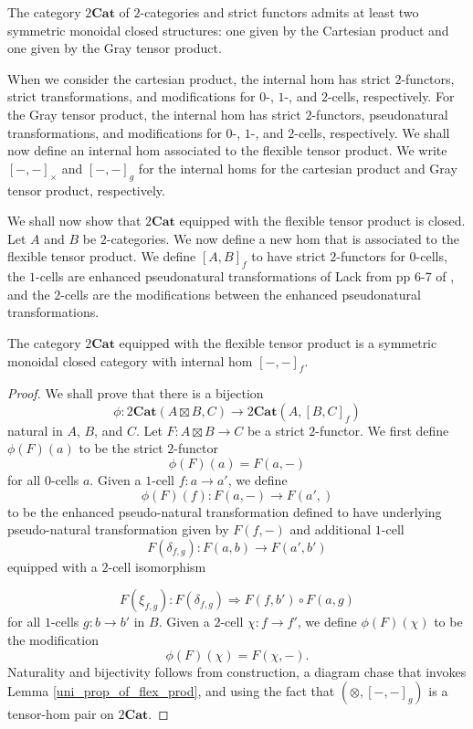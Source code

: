 \documentclass{tac}
\begin{document}
\begin{theorem}\label{new_tensor_product}
The category $2\mathbf{Cat}$ of $2$-categories and strict functors admits at least
two symmetric monoidal closed structures: one given by the Cartesian
product and one given by the Gray tensor product.
\end{theorem}

When we consider the cartesian product, the internal hom has strict $2$-functors, strict transformations, and modifications for $0$-, $1$-, and $2$-cells, respectively. For the Gray tensor product, the internal hom has strict $2$-functors, pseudonatural transformations, and modifications for $0$-, $1$-, and $2$-cells, respectively. We shall now define an internal hom associated to the flexible tensor product. We write $[-,-]_\times$ and $[-,-]_g$ for the internal homs for the cartesian product and Gray tensor product, respectively.

We shall now show that $2\mathbf{Cat}$ equipped with the flexible tensor product is closed. Let $A$ and $B$ be $2$-categories. We now define a new hom that is associated to the flexible tensor product. We define $[A,B]_f$ to have strict $2$-functors for $0$-cells, the $1$-cells are enhanced pseudonatural transformations of Lack from pp 6-7 of \cite{Lack2006}, and the $2$-cells are the modifications between the enhanced pseudonatural transformations.

\begin{theorem}\label{2_cat_with_flex_prod_is_sym_mon_closed}
    The category $2\mathbf{Cat}$ equipped with the flexible tensor product is a symmetric monoidal closed category with internal hom $[-,-]_f$.
\end{theorem}

\begin{proof}
We shall prove that there is a bijection
\[
\phi:2\mathbf{Cat}(A\boxtimes B, C)\to 2\mathbf{Cat}(A,[B,C]_f)
\]
natural in $A$, $B$, and $C$. Let $F:A\boxtimes B\to C$ be a strict $2$-functor. We first define $\phi(F)(a)$ to be the strict $2$-functor
\[
\phi(F)(a)=F(a,-)
\]
for all $0$-cells $a$. Given a $1$-cell $f:a\to a'$, we define 
\[
\phi(F)(f):F(a,-)\to F(a',)
\]
to be the enhanced pseudo-natural transformation defined to have underlying pseudo-natural transformation given by $F(f,-)$ and additional $1$-cell 
\[
F(\delta_{f,g}):F(a,b)\to F(a',b')
\]
equipped with a $2$-cell isomorphism 

\[
F(\xi_{f,g}): F(\delta_{f,g})\Rightarrow F(f,b')\circ F(a,g)
\]
for all $1$-cells $g:b\to b'$ in $B$. Given a $2$-cell $\chi:f\to f'$, we define $\phi(F)(\chi)$ to  be the modification
\[
\phi(F)(\chi)=F(\chi,-).
\]
Naturality and bijectivity follows from construction, a diagram chase that invokes Lemma \ref{uni_prop_of_flex_prod}, and using the fact that $(\otimes, [-,-]_g)$ is a tensor-hom pair on $2\mathbf{Cat}$.
\end{proof}
\end{document}

